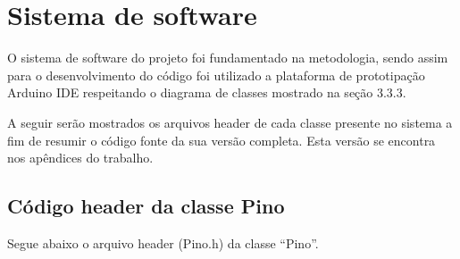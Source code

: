 \section{Sistema de software}\label{sec:ressissof}

O sistema de software do projeto foi fundamentado na metodologia, sendo assim para o desenvolvimento 
do código foi utilizado a plataforma de prototipação Arduino IDE respeitando o diagrama de classes 
mostrado na seção 3.3.3.

A seguir serão mostrados os arquivos header de cada classe presente no sistema a fim de resumir 
o código fonte da sua versão completa. Esta versão se encontra nos apêndices do trabalho.

\subsection{Código header da classe Pino}\label{subsec:respino}

Segue abaixo o arquivo header (Pino.h) da classe “Pino”.

